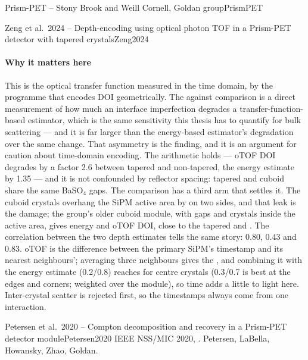 \begin{programnote}{Prism-PET -- Stony Brook and Weill Cornell, Goldan group}{PrismPET}
\begin{papernote}{Zeng et al.\ 2024 -- Depth-encoding using optical photon TOF in a Prism-PET detector with tapered crystals}{Zeng2024}
\paragraph{Why it matters here}
This is the optical transfer function measured in the time domain, by the
programme that encodes DOI geometrically. The  against 
comparison is a direct measurement of how much an interface imperfection
degrades a transfer-function-based estimator, which is the same sensitivity
this thesis has to quantify for bulk scattering --- and it is far larger than the
energy-based estimator's degradation over the same change. That asymmetry is
the finding, and it is an argument for caution about time-domain encoding.
The arithmetic holds --- oTOF DOI degrades by a factor 2.6 between tapered and
non-tapered, the energy estimate by 1.35 --- and it is not confounded by
reflector spacing: tapered and  cuboid share the same 
BaSO$_4$ gaps. The comparison has a third arm that settles it. The 
cuboid crystals overhang the SiPM active area by  on two sides, and
that leak is the damage; the group's older  cuboid module, with
 gaps and crystals inside the active area, gives  energy and
 oTOF DOI, close to the tapered  and . The
correlation between the two depth estimates tells the same story: 0.80, 0.43
and 0.83. oTOF is the difference between the primary SiPM's timestamp and its
nearest neighbours'; averaging three neighbours gives the , and
combining it with the energy estimate (0.2/0.8) reaches  for centre
crystals (0.3/0.7 is best at the edges and corners;  weighted over the
module), so time adds
a little to light here. Inter-crystal scatter is rejected first, so the
timestamps always come from one interaction.

\end{papernote}

\begin{papernote}{Petersen et al.\ 2020 -- Compton decomposition and recovery in a Prism-PET detector module}{Petersen2020}
IEEE NSS/MIC 2020, . Petersen, LaBella,
Howansky, Zhao, Goldan.


\end{papernote}
\end{programnote}
